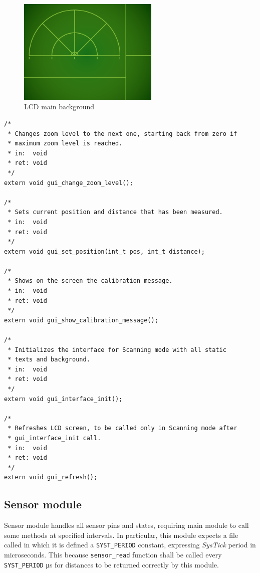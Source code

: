 \begin{figure}[tp]
\centering
\includegraphics[width=0.6\textwidth, keepaspectratio]{img/background-with-interface.png}
\caption{LCD main background}
\label{fig:background}
\end{figure}

\begin{verbatim}
/*
 * Changes zoom level to the next one, starting back from zero if
 * maximum zoom level is reached.
 * in:  void
 * ret: void
 */
extern void gui_change_zoom_level();

/*
 * Sets current position and distance that has been measured.
 * in:  void
 * ret: void
 */
extern void gui_set_position(int_t pos, int_t distance);

/*
 * Shows on the screen the calibration message.
 * in:  void
 * ret: void
 */
extern void gui_show_calibration_message();

/*
 * Initializes the interface for Scanning mode with all static
 * texts and background.
 * in:  void
 * ret: void
 */
extern void gui_interface_init();

/*
 * Refreshes LCD screen, to be called only in Scanning mode after
 * gui_interface_init call.
 * in:  void
 * ret: void
 */
extern void gui_refresh();
\end{verbatim}

\subsection{Sensor module}

Sensor module handles all sensor pins and states, requiring main module to call some methods at specified intervals. In particular, this module expects a file called  in which it is defined a \texttt{SYST_PERIOD} constant, expressing {\em SysTick} period in microseconds. This because \texttt{sensor_read} function shall be called every \texttt{SYST_PERIOD} \si{\micro\second} for distances to be returned correctly by this module.

